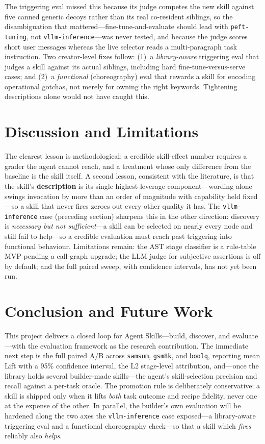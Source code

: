 \documentclass[11pt,a4paper]{article}
\begin{document}
The triggering eval missed this because its judge competes the new skill against five canned
generic decoys rather than its real co-resident siblings, so the disambiguation that
mattered---fine-tune-and-evaluate should lead with \texttt{peft-tuning}, not
\texttt{vllm-inference}---was never tested, and because the judge scores short user messages
whereas the live selector reads a multi-paragraph task instruction. Two creator-level fixes
follow: (1)~a \emph{library-aware} triggering eval that judges a skill against its actual
siblings, including hard fine-tune-versus-serve cases; and (2)~a \emph{functional}
(choreography) eval that rewards a skill for encoding operational gotchas, not merely for
owning the right keywords. Tightening descriptions alone would not have caught this.

\section{Discussion and Limitations}

The clearest lesson is methodological: a credible skill-effect number requires a grader the
agent cannot reach, and a treatment whose only difference from the baseline is the skill
itself. A second lesson, consistent with the literature, is that the skill's
\textbf{description} is its single highest-leverage component---wording alone swings
invocation by more than an order of magnitude with capability held fixed---so a skill that
never fires zeroes out every other quality it has. The \texttt{vllm-inference} case (preceding
section) sharpens this in the other direction: discovery is \emph{necessary but not
sufficient}---a skill can be selected on nearly every node and still fail to help---so a
credible evaluation must reach past triggering into functional behaviour. Limitations remain:
the AST stage
classifier is a rule-table MVP pending a call-graph upgrade; the LLM judge for subjective
assertions is off by default; and the full paired sweep, with confidence intervals, has not
yet been run.

\section{Conclusion and Future Work}

This project delivers a closed loop for Agent Skills---build, discover, and evaluate---with
the evaluation framework as the research contribution. The immediate next step is the full
paired A/B across \texttt{samsum}, \texttt{gsm8k}, and \texttt{boolq}, reporting mean Lift
with a 95\% confidence interval, the L2 stage-level attribution, and---once the library
holds several builder-made skills---the agent's skill-selection precision and recall against
a per-task oracle. The promotion rule is
deliberately conservative: a skill is shipped only when it lifts \emph{both} task outcome and
recipe fidelity, never one at the expense of the other. In parallel, the builder's own
evaluation will be hardened along the two axes the \texttt{vllm-inference} case exposed---a
library-aware triggering eval and a functional choreography check---so that a skill which
\emph{fires} reliably also \emph{helps}.
\end{document}
